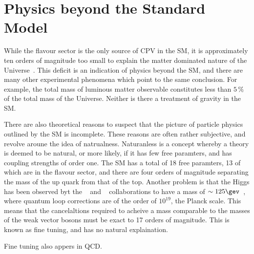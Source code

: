\section{Physics beyond the Standard Model}

While the flavour sector is the only source of CPV in the SM, it is approximately ten orders of
magnitude too small to explain the matter dominated nature of the
Universe~\cite{Cline:2006ts,Huet:1994jb}.
This deficit is an indication of physics beyond the SM, and there are many other experimental
phenomena which point to the same conclusion.
For example, the total mass of luminous matter observable constitutes less than $5\,\%$ of the
total mass of the Universe.
Neither is there a treatment of gravity in the SM.


There are also theoretical reasons to suspect that the picture of particle physics outlined by the
SM is incomplete.
These reasons are often rather subjective, and revolve aroune the idea of natrualness.
Naturanless is a concept whereby a theory is deemed to be natural, or more likely, if it has few
free paramters, and has coupling strengths of order one.
The SM has a total of 18 free paramters, 13 of which are in the flavour sector, and there are four
orders of magnitude separating the mass of the up quark from that of the top.
Another problem is that the Higgs has been observed byt the
\atlas~\cite{Aad:2008zzm} and
\cms~\cite{Chatrchyan:2008aa}
collaborations to have a mass of $\sim125\gev$~\cite{Chatrchyan:2012ufa,Aad:2012tfa}, where quantum
loop corrections are of the order of $10^{19}$, the Planck scale.
This means that the cancelaltions required to acheive a mass comparable to the masses of the weak
vector bosons must be exact to 17 orders of magnitude.
This is known as fine tuning, and has no natural explaination.

Fine tuning also appers in QCD.












